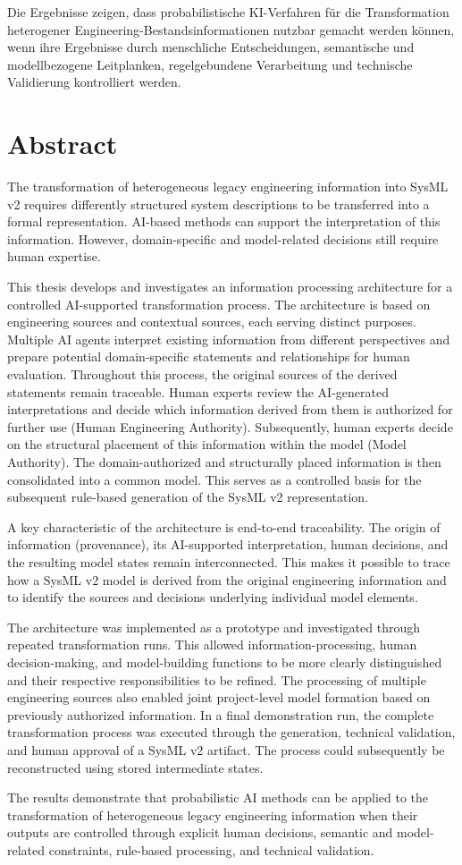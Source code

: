 Die Ergebnisse zeigen, dass probabilistische KI-Verfahren für die Transformation heterogener Engineering-Bestandsinformationen nutzbar gemacht werden können, wenn ihre Ergebnisse durch menschliche Entscheidungen, semantische und modellbezogene Leitplanken, regelgebundene Verarbeitung und technische Validierung kontrolliert werden.

\clearpage
\endgroup

\section*{Abstract}
{}

The transformation of heterogeneous legacy engineering information into SysML v2 requires differently structured system descriptions to be transferred into a formal representation. AI-based methods can support the interpretation of this information. However, domain-specific and model-related decisions still require human expertise.

This thesis develops and investigates an information processing architecture for a controlled AI-supported transformation process. The architecture is based on engineering sources and contextual sources, each serving distinct purposes. Multiple AI agents interpret existing information from different perspectives and prepare potential domain-specific statements and relationships for human evaluation. Throughout this process, the original sources of the derived statements remain traceable. Human experts review the AI-generated interpretations and decide which information derived from them is authorized for further use (Human Engineering Authority). Subsequently, human experts decide on the structural placement of this information within the model (Model Authority). The domain-authorized and structurally placed information is then consolidated into a common model. This serves as a controlled basis for the subsequent rule-based generation of the SysML v2 representation.

A key characteristic of the architecture is end-to-end traceability. The origin of information (provenance), its AI-supported interpretation, human decisions, and the resulting model states remain interconnected. This makes it possible to trace how a SysML v2 model is derived from the original engineering information and to identify the sources and decisions underlying individual model elements.

The architecture was implemented as a prototype and investigated through repeated transformation runs. This allowed information-processing, human decision-making, and model-building functions to be more clearly distinguished and their respective responsibilities to be refined. The processing of multiple engineering sources also enabled joint project-level model formation based on previously authorized information. In a final demonstration run, the complete transformation process was executed through the generation, technical validation, and human approval of a SysML v2 artifact. The process could subsequently be reconstructed using stored intermediate states.

The results demonstrate that probabilistic AI methods can be applied to the transformation of heterogeneous legacy engineering information when their outputs are controlled through explicit human decisions, semantic and model-related constraints, rule-based processing, and technical validation.